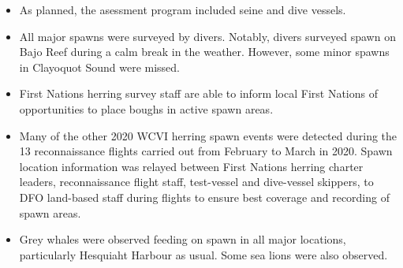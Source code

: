 \begin{itemize}

\item As planned, the asessment program included seine and dive vessels.

\item All major spawns were surveyed by divers.
Notably, divers surveyed spawn on Bajo Reef during a calm break in the weather.
However, some minor spawns in Clayoquot Sound were missed.

\item First Nations herring survey staff are able to inform local First Nations of opportunities to place boughs in active spawn areas.

\item Many of the other 2020 WCVI herring spawn events were detected during the 13 reconnaissance flights carried out from February  to March  in 2020.
Spawn location information was relayed between First Nations herring charter leaders, reconnaissance flight staff, test-vessel and dive-vessel skippers, to DFO land-based staff during flights to ensure best coverage and recording of spawn areas.

\item Grey whales were observed feeding on spawn in all major locations, particularly Hesquiaht Harbour as usual.
Some sea lions were also observed.

\end{itemize}

